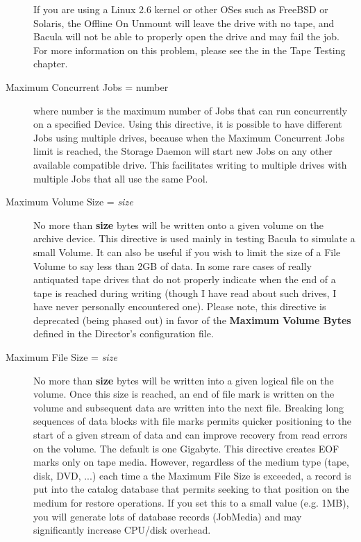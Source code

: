 \begin{description}
   If you are using a Linux 2.6 kernel or other OSes
   such as FreeBSD or Solaris, the Offline On Unmount will leave the drive
   with no tape, and Bacula will not be able to properly open the drive and
   may fail the job.  For more information on this problem, please see the
    in the Tape
   Testing chapter.

\item [Maximum Concurrent Jobs = \lt{}number\gt{}]
   where \lt{}number\gt{} is the maximum number of Jobs that can run
   concurrently on a specified Device.  Using this directive, it is possible
   to have different Jobs using multiple drives, because when 
   the Maximum Concurrent Jobs limit is
   reached, the Storage Daemon will start new Jobs on any other available
   compatible drive.  This facilitates writing to multiple drives with
   multiple Jobs that all use the same Pool.

\item [Maximum Volume Size = {\it size}]
   No more than {\bf size} bytes will be written onto a given volume on the
   archive device.  This directive is used mainly in testing Bacula to
   simulate a small Volume.  It can also be useful if you wish to limit the
   size of a File Volume to say less than 2GB of data.  In some rare cases
   of really antiquated tape drives that do not properly indicate when the
   end of a tape is reached during writing (though I have read about such
   drives, I have never personally encountered one).  Please note, this
   directive is deprecated (being phased out) in favor of the {\bf Maximum
   Volume Bytes} defined in the Director's configuration file.

\item [Maximum File Size = {\it size}]
   No more than {\bf size} bytes will be written into a given logical file
   on the volume.  Once this size is reached, an end of file mark is
   written on the volume and subsequent data are written into the next
   file.  Breaking long sequences of data blocks with file marks permits
   quicker positioning to the start of a given stream of data and can
   improve recovery from read errors on the volume.  The default is one
   Gigabyte.  This directive creates EOF marks only on tape media.
   However, regardless of the medium type (tape, disk, DVD, ...) each time
   a the Maximum File Size is exceeded, a record is put into the catalog
   database that permits seeking to that position on the medium for
   restore operations. If you set this to a small value (e.g. 1MB),
   you will generate lots of database records (JobMedia) and may
   significantly increase CPU/disk overhead.


\end{description}
